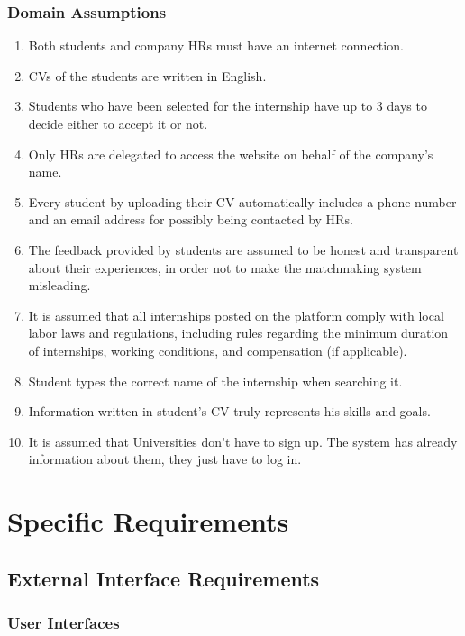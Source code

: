 \documentclass{article}
\begin{document}
\subsubsection{Domain Assumptions}
\begin{enumerate}[label=D\arabic*.]
    \item Both students and company HRs must have an internet connection.
    \item CVs of the students are written in English.
    \item Students who have been selected for the internship have up to 3 days to decide either to accept it or not.
    \item Only HRs are delegated to access the website on behalf of the company's name.
    \item Every student by uploading their CV automatically includes a phone number and an email address for possibly being contacted by HRs.
    \item The feedback provided by students are assumed to be honest and transparent about their experiences, in order not to make the matchmaking system misleading.
    \item It is assumed that all internships posted on the platform comply with local labor laws and regulations, including rules regarding the minimum duration of internships, working conditions, and compensation (if applicable).
    \item Student types the correct name of the internship when searching it.
    \item Information written in student's CV truly represents his skills and goals.
    \item It is assumed that Universities don't have to sign up. The system has already information about them, they just have to log in.

\end{enumerate}

\newpage

\section{Specific Requirements}

\subsection{External Interface Requirements}
\subsubsection{User Interfaces}
\end{document}
